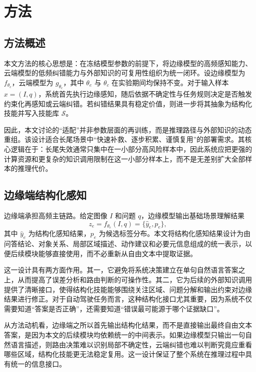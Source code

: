 
\chapter{方法}
\label{cha:method}

\section{方法概述}
\label{sec:method-overview}

本文方法的核心思想是：在冻结模型参数的前提下，将边缘模型的高频感知能力、云端模型的低频纠错能力与外部知识的可复用性组织为统一闭环。设边缘模型为 $f_{\theta_e}$，云端模型为 $g_{\theta_c}$，其中 $\theta_e$ 与 $\theta_c$ 在实验期间均保持不变。对于输入样本 $x=(I,q)$，系统首先执行边缘感知，随后依据不确定性与任务规则决定是否触发约束化再感知或云端纠错。若纠错结果具有稳定价值，则进一步将其抽象为结构化技能并写入技能库 $\mathcal{S}$。

因此，本文讨论的“适配”并非参数层面的再训练，而是推理路径与外部知识的动态重组。该设计适合长尾场景中“快速补救、逐步积累、谨慎复用”的部署需求。其核心逻辑在于：长尾失效通常只集中在一小部分高风险样本中，因此系统应把更强的计算资源和更复杂的知识调用限制在这一小部分样本上，而不是无差别扩大全部样本的推理代价。

\section{边缘端结构化感知}
\label{sec:method-edge}

边缘端承担高频主链路。给定图像 $I$ 和问题 $q$，边缘模型输出基础场景理解结果
\begin{equation}
  z_e = f_{\theta_e}(I,q)=\{\hat{y}_e,p_e\},
\end{equation}
其中 $\hat{y}_e$ 为结构化感知结果，$p_e$ 为候选标签分布。本文将结构化感知结果设计为由问答结论、对象关系、局部区域描述、动作建议和必要元信息组成的统一表示，以便后续模块能够直接使用，而不必重新从自由文本中提取证据。

这一设计具有两方面作用。其一，它避免将系统决策建立在单句自然语言答案之上，从而提高了误差分析和路由判断的可操作性。其二，它为后续的外部知识调用提供了清晰接口，使得结构化技能能够围绕关注区域、问题分解和输出约束对边缘结果进行修正。对于自动驾驶任务而言，这种结构化接口尤其重要，因为系统不仅需要知道“答案是否正确”，还需要知道“错误最可能源于哪个证据缺口”。

从方法动机看，边缘端之所以首先输出结构化结果，而不是直接输出最终自由文本答案，是因为本文的后续模块均依赖统一的中间表示。如果边缘模型只输出一句自然语言描述，则路由决策难以识别局部不确定性，云端纠错也难以判断究竟应重看哪些区域，结构化技能更无法稳定复用。这一设计保证了整个系统在推理过程中具有统一的信息接口。

